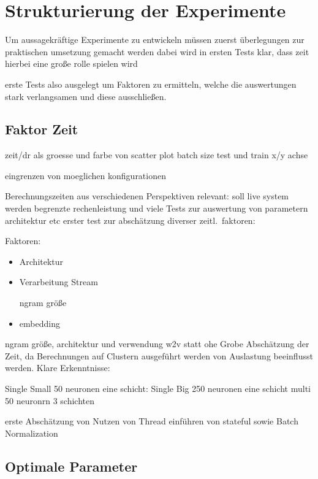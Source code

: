     \section{Strukturierung der Experimente}\label{sec:StrukExp}
        Um aussagekräftige Experimente zu entwickeln müssen zuerst 
        überlegungen zur praktischen umsetzung gemacht werden
        dabei wird in ersten Tests klar, dass zeit hierbei eine große rolle spielen wird

        erste Tests also ausgelegt um Faktoren zu ermitteln, welche die auswertungen stark verlangsamen
        und diese ausschließen.

        \subsection{Faktor Zeit}

            zeit/dr als groesse und farbe von scatter plot
            batch size test und train x/y achse

            eingrenzen von moeglichen konfigurationen

            Berechnungszeiten aus verschiedenen Perspektiven relevant:
            soll live system werden
            begrenzte rechenleistung und viele Tests zur auswertung von parametern architektur etc
            erster test zur abschätzung diverser zeitl.\ faktoren:

            Faktoren:
            \begin{itemize}
                \item Architektur
                \item Verarbeitung Stream

                     ngram größe
                \item embedding
            \end{itemize}

            ngram größe, architektur und verwendung w2v statt ohe
            Grobe Abschätzung der Zeit, da Berechnungen auf Clustern ausgeführt werden von Auslastung beeinflusst werden.
            Klare Erkenntnisse:

                Single Small 50 neuronen eine schicht:
                Single Big 250 neuronen eine schicht
                multi 50 neuronrn 3 schichten

            erste Abschätzung von Nutzen von Thread 
            einführen von stateful sowie Batch Normalization

        \subsection{Optimale Parameter}

